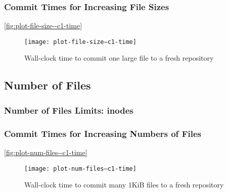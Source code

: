 %

\subsubsection{Commit Times for Increasing File Sizes}


\autoref{fig:plot-file-size--c1-time}

\begin{figure}[p]
    \caption{Wall-clock time to commit one large file to a fresh repository}
    \label{fig:plot-file-size--c1-time}
    \centering

    \explainlogsubfig

    \texttt{[image: plot-file-size--c1-time]}
\end{figure}

%



\subsection{Number of Files}

\subsubsection{Number of Files Limits: inodes}


\subsubsection{Commit Times for Increasing Numbers of Files}

\autoref{fig:plot-num-files--c1-time}

\begin{figure}[p]
    \caption{Wall-clock time to commit many 1KiB files to a fresh repository}
    \label{fig:plot-num-files--c1-time}
    \centering

    \explainlogsubfig

    \texttt{[image: plot-num-files--c1-time]}
\end{figure}
